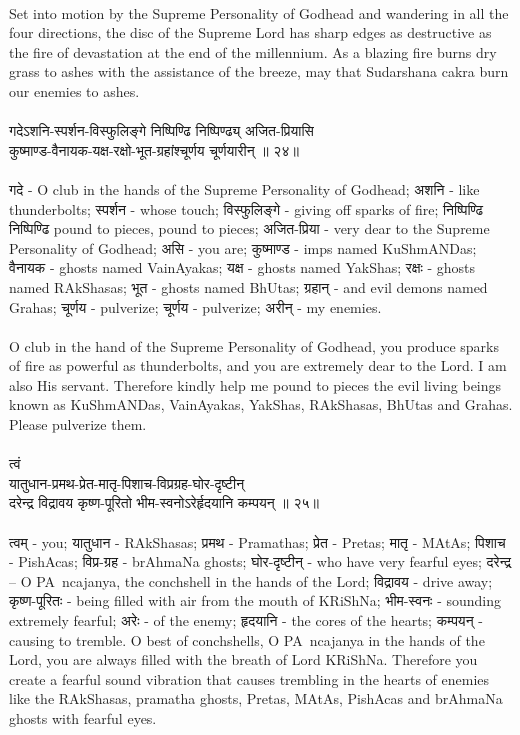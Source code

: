\\
Set into motion by the Supreme Personality of Godhead and wandering in all the four directions, the disc of the Supreme Lord has sharp edges as destructive as the fire of devastation at the end of the millennium. As a blazing fire burns dry grass to ashes with the assistance of the breeze, may that Sudarshana cakra burn our enemies to ashes.\\
\\ 
गदेऽशनि-स्पर्शन-विस्फुलिङ्गे निष्पिण्ढि निष्पिण्ढ्य् अजित-प्रियासि\\
कुष्माण्ड-वैनायक-यक्ष-रक्षो-भूत-ग्रहांश्चूर्णय चूर्णयारीन् ॥ २४॥\\
\\
गदे - O club in the hands of the Supreme Personality of Godhead;  अशनि - like thunderbolts; स्पर्शन -  whose touch;  विस्फुलिङ्गे - giving off sparks of fire;  निष्पिण्ढि निष्पिण्ढि  pound to pieces, pound to pieces;  अजित-प्रिया - very dear to the Supreme Personality of Godhead; असि - you are;  कुष्माण्ड - imps named KuShmANDas;  वैनायक -  ghosts named VainAyakas;  यक्ष - ghosts named YakShas; रक्षः - ghosts named RAkShasas;  भूत - ghosts named BhUtas;  ग्रहान् - and evil demons named Grahas;  चूर्णय - pulverize; चूर्णय -  pulverize;  अरीन् - my enemies.\\
\\
O club in the hand of the Supreme Personality of Godhead, you produce sparks of fire as powerful as thunderbolts, and you are extremely dear to the Lord. I am also His servant. Therefore kindly help me pound to pieces the evil living beings known as KuShmANDas, VainAyakas, YakShas, RAkShasas, BhUtas and Grahas. Please pulverize them.\\
\\
त्वं\\
यातुधान-प्रमथ-प्रेत-मातृ-पिशाच-विप्रग्रह-घोर-दृष्टीन्\\
दरेन्द्र विद्रावय कृष्ण-पूरितो भीम-स्वनोऽरेर्हृदयानि कम्पयन् ॥ २५॥\\
\\
त्वम् - you;  यातुधान - RAkShasas;  प्रमथ - Pramathas;  प्रेत - Pretas;  मातृ - MAtAs;  पिशाच - PishAcas;  विप्र-ग्रह -  brAhmaNa ghosts; घोर-दृष्टीन् - who have very fearful eyes;  दरेन्द्र – O PA~ncajanya, the conchshell in the hands of the Lord;  विद्रावय - drive away;  कृष्ण-पूरितः - being filled with air from the mouth of KRiShNa;  भीम-स्वनः - sounding extremely fearful;  अरेः - of the enemy;  हृदयानि - the cores of the hearts; कम्पयन् - causing to tremble.  O best of conchshells, O PA~ncajanya in the hands of the Lord, you are always filled with the breath of Lord KRiShNa. Therefore you create a fearful sound vibration that causes trembling in the hearts of enemies like the RAkShasas, pramatha ghosts, Pretas, MAtAs, PishAcas and brAhmaNa ghosts with fearful eyes.\\
